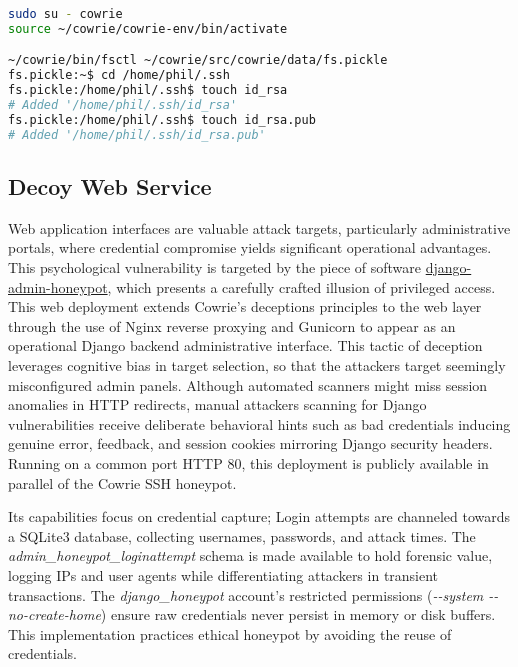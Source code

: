 \documentclass{cls/ULBreport}
\begin{document}
\begin{lstlisting}[language=bash,label={lst:cowrie-context},caption={Python Virtual Filesystem Controller}]  
sudo su - cowrie
source ~/cowrie/cowrie-env/bin/activate

~/cowrie/bin/fsctl ~/cowrie/src/cowrie/data/fs.pickle
fs.pickle:~$ cd /home/phil/.ssh
fs.pickle:/home/phil/.ssh$ touch id_rsa 
# Added '/home/phil/.ssh/id_rsa'
fs.pickle:/home/phil/.ssh$ touch id_rsa.pub 
# Added '/home/phil/.ssh/id_rsa.pub'\end{lstlisting}  


    \subsection{Decoy Web Service}
    
Web application interfaces are valuable attack targets, particularly administrative portals, where credential compromise yields significant operational advantages. This psychological vulnerability is targeted by the piece of software \href{https://github.com/dmpayton/django-admin-honeypot}{django-admin-honeypot}, which presents a carefully crafted illusion of privileged access. This web deployment extends Cowrie's deceptions principles to the web layer through the use of Nginx reverse proxying and Gunicorn to appear as an operational Django backend administrative interface. This tactic of deception leverages cognitive bias in target selection, so that the attackers target seemingly misconfigured admin panels. Although automated scanners might miss session anomalies in HTTP redirects, manual attackers scanning for Django vulnerabilities receive deliberate behavioral hints such as bad credentials inducing genuine error, feedback, and session cookies mirroring Django security headers. Running on a common port HTTP 80, this deployment is publicly available in parallel of the Cowrie SSH honeypot. 

Its capabilities focus on credential capture; Login attempts are channeled towards a
SQLite3 database, collecting usernames, passwords, and attack times. The \textit{admin\_honeypot\_loginattempt} schema is made available to hold forensic value, logging IPs and user agents while differentiating attackers in transient transactions. The \textit{django\_honeypot} account's restricted permissions (\textit{-{-}system -{-}no-create-home}) ensure raw credentials never persist in memory or disk buffers. This implementation practices ethical honeypot by avoiding the reuse of credentials.
    
\end{document}
